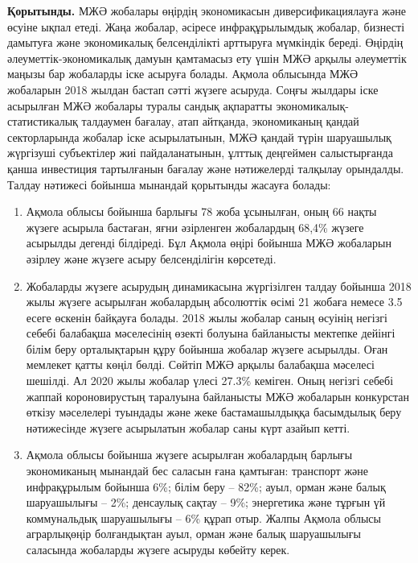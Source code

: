 {\bfseries Қорытынды.} МЖӘ жобалары өңірдің экономикасын
диверсификациялауға және өсуіне ықпал етеді. Жаңа жобалар, әсіресе
инфрақұрылымдық жобалар, бизнесті дамытуға және экономикалық
белсенділікті арттыруға мүмкіндік береді. Өңірдің
әлеуметтік-экономикалық дамуын қамтамасыз ету үшін МЖӘ арқылы әлеуметтік
маңызы бар жобаларды іске асыруға болады. Ақмола облысында МЖӘ жобаларын
2018 жылдан бастап сәтті жүзеге асыруда. Соңғы жылдары іске асырылған
МЖӘ жобалары туралы сандық ақпаратты экономикалық-статистикалық
талдаумен бағалау, атап айтқанда, экономиканың қандай секторларында
жобалар іске асырылатынын, МЖӘ қандай түрін шаруашылық жүргізуші
субъектілер жиі пайдаланатынын, ұлттық деңгеймен салыстырғанда қанша
инвестиция тартылғанын бағалау және нәтижелерді талқылау орындалды.
Талдау нәтижесі бойынша мынандай қорытынды жасауға болады:

\begin{enumerate}
\def\labelenumi{\arabic{enumi}.}
\item
  Ақмола облысы бойынша барлығы 78 жоба ұсынылған, оның 66 нақты жүзеге
  асырыла бастаған, яғни әзірленген жобалардың 68,4\% жүзеге асырылды
  дегенді білдіреді. Бұл Ақмола өңірі бойынша МЖӘ жобаларын әзірлеу және
  жүзеге асыру белсенділігін көрсетеді.
\item
  Жобаларды жүзеге асырудың динамикасына жүргізілген талдау бойынша 2018
  жылы жүзеге асырылған жобалардың абсолюттік өсімі 21 жобаға немесе 3.5
  есеге өскенін байқауға болады. 2018 жылы жобалар саның өсуінің негізгі
  себебі балабақша мәселесінің өзекті болуына байланысты мектепке
  дейінгі білім беру орталықтарын құру бойынша жобалар жүзеге асырылды.
  Оған мемлекет қатты көңіл бөлді. Сөйтіп МЖӘ арқылы балабақша мәселесі
  шешілді. Ал 2020 жылы жобалар үлесі 27.3\% кеміген. Оның негізгі
  себебі жаппай короновирустың таралуына байланысты МЖӘ жобаларын
  конкурстан өткізу мәселелері туындады және жеке бастамашылдыққа
  басымдылық беру нәтижесінде жүзеге асырылатын жобалар саны күрт азайып
  кетті.
\item
  Ақмола облысы бойынша жүзеге асырылған жобалардың барлығы экономиканың
  мынандай бес саласын ғана қамтыған: транспорт және инфрақұрылым
  бойынша 6\%; білім беру -- 82\%; ауыл, орман және балық шаруашылығы --
  2\%; денсаулық сақтау -- 9\%; энергетика және тұрғын үй коммунальдық
  шаруашылығы -- 6\% құрап отыр. Жалпы Ақмола облысы аграрлықөңір
  болғандықтан ауыл, орман және балық шаруашылығы саласында жобаларды
  жүзеге асыруды көбейту керек.
\end{enumerate}

